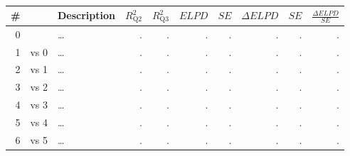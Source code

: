 \documentclass[12pt,a4paper]{article}
\begin{document}
\begin{table}
\caption{}
\centering
{}
\small	
\begin{tabularx}{\linewidth}{r@{~}rXrrrrrrr} \toprule
\# &  & Description & $R^2_\text{Q2}$ & $R^2_\text{Q3}$ & $\textit{ELPD}$ & $\textit{SE}$ & $\Delta\textit{ELPD}$ & $\textit{SE}$ & $\frac{\Delta\textit{ELPD}}{\textit{SE}}$ \\ \midrule 
0 &      & \ldots & . & . & . & . & . & . & . \\
1 & vs 0 & \ldots & . & . & . & . & . & . & . \\
2 & vs 1 & \ldots & . & . & . & . & . & . & . \\
3 & vs 2 & \ldots & . & . & . & . & . & . & . \\ \midrule
4 & vs 3 & \ldots & . & . & . & . & . & . & . \\
5 & vs 4 & \ldots & . & . & . & . & . & . & . \\
6 & vs 5 & \ldots & . & . & . & . & . & . & . \\
\bottomrule
\end{tabularx}
\label{tab:t3}
\end{table}
\end{document}
